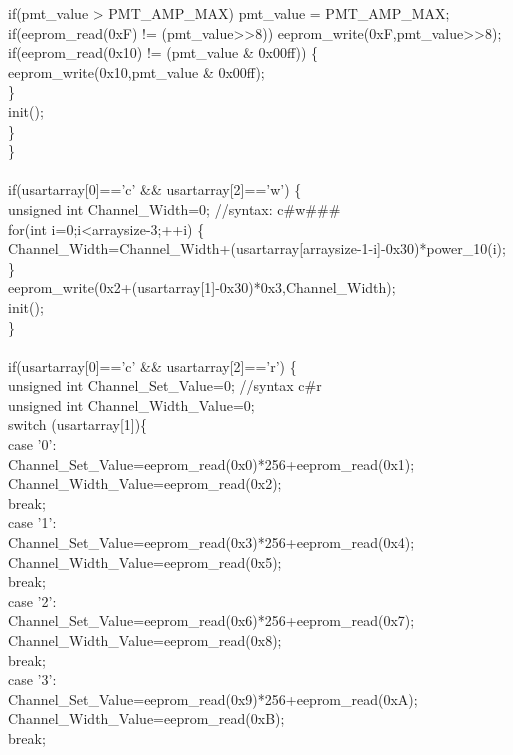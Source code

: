 \tabto*{1.5cm}	if(pmt\_value > PMT\_AMP\_MAX) pmt\_value = PMT\_AMP\_MAX;\\
\tabto*{1.5cm}	if(eeprom\_read(0xF) != (pmt\_value>>8)) eeprom\_write(0xF,pmt\_value>>8);\\
\tabto*{1.5cm}	if(eeprom\_read(0x10) != (pmt\_value \& 0x00ff)) \{\\
\tabto*{2cm} eeprom\_write(0x10,pmt\_value \& 0x00ff);\\
\tabto*{1.5cm} \}\\
\tabto*{1.5cm}	init();\\	
\tabto*{1cm}\}\\
\tabto*{.5cm}\}\\
\\
\tabto*{.5cm} if(usartarray[0]=='c' \&\& usartarray[2]=='w') \{\\
\tabto*{1cm} unsigned int Channel\_Width=0; \tabto*{7.5cm} //syntax:  c\#w\#\#\# \\	
\tabto*{1cm} for(int i=0;i<arraysize-3;++i) \{\\ 
\tabto*{1.5cm} Channel\_Width=Channel\_Width+(usartarray[arraysize-1-i]-0x30)*power\_10(i);\\
\tabto*{1cm} \}\\
\tabto*{1cm} eeprom\_write(0x2+(usartarray[1]-0x30)*0x3,Channel\_Width);\\
\tabto*{1cm} init();\\
\tabto*{.5cm}\}\\
\\
\tabto*{.5cm} if(usartarray[0]=='c' \&\& usartarray[2]=='r') \{  \\
\tabto*{1cm} unsigned int Channel\_Set\_Value=0;  \tabto*{7.5cm}//syntax c\#r \\
\tabto*{1cm} unsigned int Channel\_Width\_Value=0;\\
\tabto*{1cm} switch (usartarray[1])\{\\
\tabto*{1.5cm} case '0':\\
\tabto*{2cm}Channel\_Set\_Value=eeprom\_read(0x0)*256+eeprom\_read(0x1);\\
\tabto*{2cm}Channel\_Width\_Value=eeprom\_read(0x2);\\
\tabto*{2cm}break;\\
\tabto*{1.5cm} case '1':\\
\tabto*{2cm} Channel\_Set\_Value=eeprom\_read(0x3)*256+eeprom\_read(0x4);\\
\tabto*{2cm} Channel\_Width\_Value=eeprom\_read(0x5);\\
\tabto*{2cm} break;\\
\tabto*{1.5cm} case '2':\\
\tabto*{2cm} Channel\_Set\_Value=eeprom\_read(0x6)*256+eeprom\_read(0x7);\\
\tabto*{2cm} Channel\_Width\_Value=eeprom\_read(0x8);\\
\tabto*{2cm} break;\\
\tabto*{1.5cm} case '3':\\
\tabto*{2cm} Channel\_Set\_Value=eeprom\_read(0x9)*256+eeprom\_read(0xA);\\
\tabto*{2cm} Channel\_Width\_Value=eeprom\_read(0xB);\\
\tabto*{2cm} break;\\


